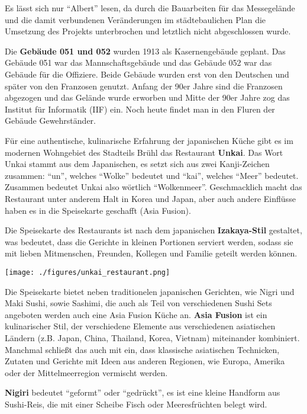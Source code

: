 \documentclass[landscape, a4paper]{article}
\newcommand\alert[1]{\textcolor{PrimaryColor}{\textbf{#1}}}
\begin{document}
\hfill%
\vrule width 0.01cm
\hfill%
\begin{minipage}[t]{0.31\textwidth}
	\vspace{0cm}
	\setlength{\parskip}{0.25cm}

 Es lässt sich nur \enquote{Albert} lesen, da durch die Bauarbeiten für das Messegelände und die damit verbundenen Veränderungen im städtebaulichen Plan die Umsetzung des Projekts unterbrochen und letztlich nicht abgeschlossen wurde.

  Die \alert{Gebäude 051 und 052} wurden 1913 als Kasernengebäude geplant. Das Gebäude 051 war das Mannschaftsgebäude und das Gebäude 052 war das Gebäude für die Offiziere. Beide Gebäude wurden erst von den Deutschen und später von den Franzosen genutzt. Anfang der 90er Jahre sind die Franzosen abgezogen und das Gelände wurde erworben und Mitte der 90er Jahre zog das Institut für Informatik (IIF) ein. Noch heute findet man in den Fluren der Gebäude Gewehrständer.

  Für eine authentische, kulinarische Erfahrung der japanischen Küche gibt es im modernen Wohngebiet des Stadteils Brühl das Restaurant \alert{Unkai}. Das Wort Unkai stammt aus dem Japanischen, es setzt sich aus zwei Kanji-Zeichen zusammen: \enquote{un}, welches \enquote{Wolke} bedeutet und \enquote{kai}, welches \enquote{Meer} bedeutet. Zusammen bedeutet Unkai also wörtlich \enquote{Wolkenmeer}. Geschmacklich macht das Restaurant unter anderem Halt in Korea und Japan, aber auch andere Einflüsse haben es in die Speisekarte geschafft (Asia Fusion). 

  Die Speisekarte des Restaurants ist nach dem japanischen \alert{Izakaya-Stil} gestaltet, was bedeutet, dass die Gerichte in kleinen Portionen serviert werden, sodass sie mit lieben Mitmenschen, Freunden, Kollegen und Familie geteilt werden können. %

	\texttt{[image: ./figures/unkai\_restaurant.png]}
	\setlength{\parskip}{0.25cm}

  Die Speisekarte bietet neben traditionelen japanischen Gerichten, wie Nigri und Maki Sushi, sowie Sashimi, die auch als Teil von verschiedenen Sushi Sets angeboten werden auch eine Asia Fusion Küche an. \alert{Asia Fusion} ist ein kulinarischer Stil, der verschiedene Elemente aus verschiedenen asiatischen Ländern (z.B. Japan, China, Thailand, Korea, Vietnam) miteinander kombiniert. Manchmal schließt das auch mit ein, dass klassische asiatischen Technicken, Zutaten und Gerichte mit Ideen aus anderen Regionen, wie Europa, Amerika oder der Mittelmeerregion vermischt werden.

  \alert{Nigiri} bedeutet \enquote{geformt} oder \enquote{gedrückt}, es ist eine kleine Handform aus Sushi-Reis, die mit einer Scheibe Fisch oder Meeresfrüchten belegt wird.
\end{minipage}%
\end{document}

